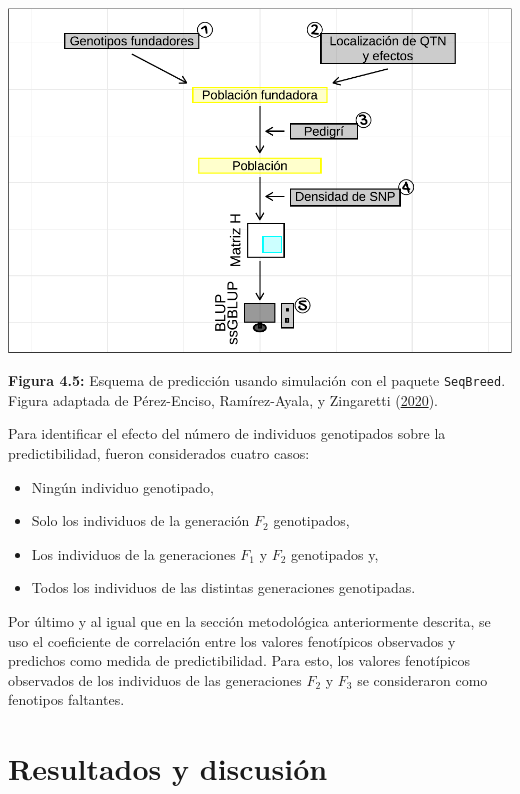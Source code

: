 \documentclass[11pt,spanish,a4paper,oneside,]{book} %
\begin{document}
\begin{center}\includegraphics[width=1\linewidth]{figures/Esquema_2} \end{center}

\begin{center}
\textbf{Figura 4.5:} Esquema de predicción usando simulación con el paquete \texttt{SeqBreed}. Figura adaptada de Pérez-Enciso, Ramírez-Ayala, y Zingaretti (\protect\hyperlink{ref-cite:47}{2020}).

\end{center}

Para identificar el efecto del número de individuos genotipados sobre la predictibilidad, fueron considerados cuatro casos:

\begin{itemize}
\item
  Ningún individuo genotipado,
\item
  Solo los individuos de la generación \(F_{2}\) genotipados,
\item
  Los individuos de la generaciones \(F_{1}\) y \(F_{2}\) genotipados y,
\item
  Todos los individuos de las distintas generaciones genotipadas.
\end{itemize}

Por último y al igual que en la sección metodológica anteriormente descrita, se uso el coeficiente de correlación entre los valores fenotípicos observados y predichos como medida de predictibilidad. Para esto, los valores fenotípicos observados de los individuos de las generaciones \(F_{2}\) y \(F_{3}\) se consideraron como fenotipos faltantes.

\hypertarget{resultados-y-discusiuxf3n}{%
\chapter{Resultados y discusión}\label{resultados-y-discusiuxf3n}}
\end{document}
